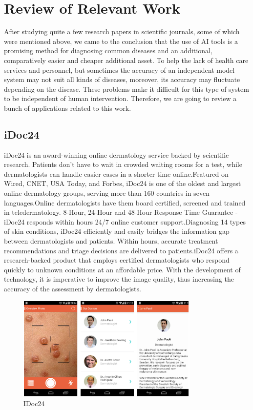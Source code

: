 \documentclass{article}
\begin{document}
\section{Review of Relevant Work }After studying quite a few research papers in scientific journals, some of which were mentioned above, we came to the conclusion that the use of AI tools is a promising method for diagnosing common diseases and an additional, comparatively easier and cheaper additional asset. To help the lack of health care services and personnel, but sometimes the accuracy of an independent model system may not suit all kinds of diseases, moreover, its accuracy may fluctuate depending on the disease. These problems make it difficult for this type of system to be independent of human intervention. Therefore, we are going to review a bunch of applications related to this work.

\subsection{iDoc24}iDoc24 is an award-winning online dermatology service backed by scientific research. Patients don't have to wait in crowded waiting rooms for a test, while dermatologists can handle easier cases in a shorter time online.Featured on Wired, CNET, USA Today, and Forbes, iDoc24 is one of the oldest and largest online dermatology groups, serving more than 160 countries in seven languages.Online dermatologists have them board certified, screened and trained in teledermatology. 8-Hour, 24-Hour and 48-Hour Response Time Guarantee - iDoc24 responds within hours 24/7 online customer support.Diagnosing 14 types of skin conditions, iDoc24 efficiently and easily bridges the information gap between dermatologists and patients.
Within hours, accurate treatment recommendations and triage decisions are delivered to patients.iDoc24 offers a research-backed product that employs certified dermatologists who respond quickly to unknown conditions at an affordable price.
With the development of technology, it is imperative to improve the image quality, thus increasing the accuracy of the assessment by dermatologists.

\begin{figure}[H]
 \centering 
 \includegraphics[heigH= 8cm, width=9cm]{Figures/IDoc24.PNG} 
 \caption{IDoc24}
\end{figure}
 
\end{document}
